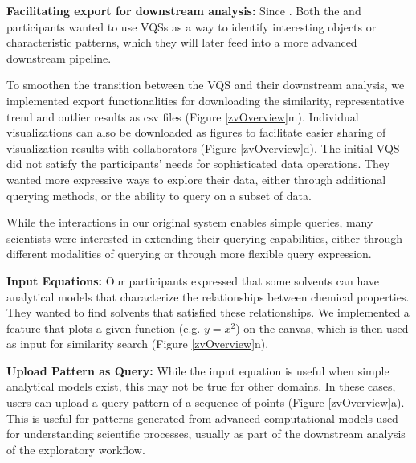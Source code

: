 \par \textbf{Facilitating export for downstream analysis:} Since . Both the \astro and \bio participants wanted to use VQSs as a way to identify interesting objects or characteristic patterns, which they will later feed into a more advanced downstream pipeline. 
\par To smoothen the transition between the VQS and their downstream analysis, we implemented export functionalities for downloading the similarity, representative trend and outlier results as csv files (Figure \ref{zvOverview}m). Individual visualizations can also be downloaded as figures to facilitate easier sharing of visualization results with collaborators (Figure \ref{zvOverview}d). 
The initial VQS did not satisfy the participants' needs for sophisticated data operations. They wanted more expressive ways to explore their data, either through additional querying methods, or the ability to query on a subset of data.
\par While the interactions in our original system enables simple queries, many scientists were interested in extending their querying capabilities, either through different modalities of querying or through more flexible query expression.  
\par \textbf{Input Equations:} Our \matsci participants expressed that some solvents can have analytical models that characterize the relationships between chemical properties. They wanted to find solvents that satisfied these relationships. We implemented a feature that plots a given function (e.g. $y=x^2$) on the canvas, which is then used as input for similarity search (Figure \ref{zvOverview}n).
\par \textbf{Upload Pattern as Query:} While the input equation is useful when simple analytical models exist, this may not be true for other domains. In these cases, users can upload a query pattern of a sequence of points (Figure \ref{zvOverview}a). This is useful for patterns generated from advanced computational models used for understanding scientific processes, usually as part of the downstream analysis of the exploratory workflow. %
